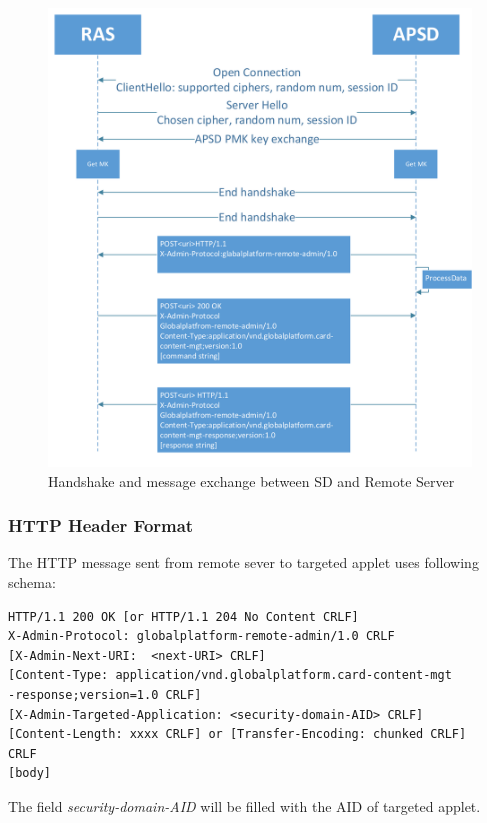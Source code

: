 \begin{figure}[!htbp]
	\centering
	\includegraphics[width=1\textwidth]{communication-flow}
		\caption{Handshake and message exchange between SD and Remote Server}
	\label{fig:communication-flow}
\end{figure}

\subsubsection{HTTP Header Format} \label{secHTTPHeader}
The HTTP message sent from remote sever to targeted applet uses following schema\cite{gp}:
\begin{Verbatim}[fontsize=\relsize{-1}, frame=lines,framesep=4mm, label=\fbox{\small\emph{Http Request Schema}}]
HTTP/1.1 200 OK [or HTTP/1.1 204 No Content CRLF]
X-Admin-Protocol: globalplatform-remote-admin/1.0 CRLF
[X-Admin-Next-URI:  <next-URI> CRLF]
[Content-Type: application/vnd.globalplatform.card-content-mgt
-response;version=1.0 CRLF]
[X-Admin-Targeted-Application: <security-domain-AID> CRLF]
[Content-Length: xxxx CRLF] or [Transfer-Encoding: chunked CRLF]
CRLF
[body]
\end{Verbatim}
The field \emph{security-domain-AID} will be filled with the AID of targeted applet.


